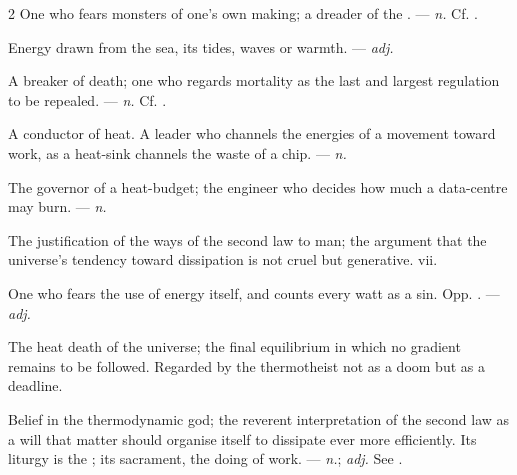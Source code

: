 \begin{multicols}{2}
 One who fears monsters of one's own making; a dreader of the . —  \textit{n.} Cf. .

 Energy drawn from the sea, its tides, waves or warmth. —  \textit{adj.}

 A breaker of death; one who regards mortality as the last and largest regulation to be repealed.  —  \textit{n.} Cf. .

  A conductor of heat.   A leader who channels the energies of a movement toward work, as a heat-sink channels the waste of a chip. —  \textit{n.}

 The governor of a heat-budget; the engineer who decides how much a data-centre may burn. —  \textit{n.}

 The justification of the ways of the second law to man; the argument that the universe's tendency toward dissipation is not cruel but generative.   vii.

 One who fears the use of energy itself, and counts every watt as a sin. Opp. . —  \textit{adj.}

 The heat death of the universe; the final equilibrium in which no gradient remains to be followed. Regarded by the thermotheist not as a doom but as a deadline. 

 Belief in the thermodynamic god; the reverent interpretation of the second law as a will that matter should organise itself to dissipate ever more efficiently. Its liturgy is the ; its sacrament, the doing of work. —  \textit{n.};  \textit{adj.} See .


\end{multicols}
